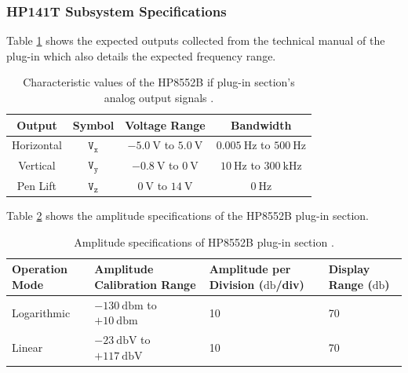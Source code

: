 \documentclass[class=report,11pt,crop=false]{standalone}
\begin{document}
	\subsubsection{HP141T Subsystem Specifications}
	
	Table \ref{tab:hp8552b-output-vals} shows the expected outputs collected from the technical manual of the plug-in which also details the expected frequency range. 
	\begin{table}[ht!]
		\centering
		\label{tab:hp8552b-output-vals}
		\begin{tabular}{|c|c|c|c|}
			\hline
			\cellcolor{cyan!25}\textbf{Output}	& \cellcolor{cyan!25}\textbf{Symbol}& \cellcolor{cyan!25}\textbf{Voltage Range}	& \cellcolor{cyan!25}\textbf{Bandwidth} \\
			\hline
			Horizontal & $\texttt{V}_\texttt{x}$	& $-\SI{5.0}{\volt}$ to $\SI{+5.0}{\volt}$	& $\SI{0.005}{\hertz}$ to $\SI{500}{\hertz}$\\
			\hline
			Vertical & $\texttt{V}_\texttt{y}$	& $-\SI{0.8}{\volt}$ to $\SI{0}{\volt}$	& $\SI{10}{\hertz}$ to $\SI{300}{\kilo\hertz}$\\
			\hline
			Pen Lift & $\texttt{V}_\texttt{z}$  & $\SI{0}{\volt}$ to $\SI{14}{\volt}$  & $\SI{0}{\hertz}$\\
			\hline
		\end{tabular}
		\caption{Characteristic values of the HP8552B \acrshort{if} plug-in section's analog output signals \cite{hp8552b}.}
	\end{table}

	Table \ref{tab:hp8552b-amplitude-specs} shows the amplitude specifications of the HP8552B plug-in section. 
	
	\begin{table}[ht!]
		\centering
		\label{tab:hp8552b-amplitude-specs}
		\begin{tabular}{|m{8em}|m{10em}|m{8em}|m{8em}|}
			\hline
			\cellcolor{cyan!25}\textbf{Operation Mode}	& \cellcolor{cyan!25}\textbf{Amplitude Calibration Range} & \cellcolor{cyan!25}\textbf{Amplitude per Division} ($\si{\decibel}$/div)	& \cellcolor{cyan!25}\textbf{Display Range} ($\si{\decibel}$)\\
			\hline
			Logarithmic & $-\SI{130}{\decibel}\text{m}$	to $+\SI{10}{\decibel}\text{m}$ & 10 & 70	\\
			\hline
			Linear & $-\SI{23}{\decibel\volt}$	to $+\SI{117}{\decibel\volt}$ 	& 10 & 70\\
			\hline
		\end{tabular}
		\caption{Amplitude specifications of HP8552B plug-in section \cite{hp8552b}.}
	\end{table}
\end{document}
